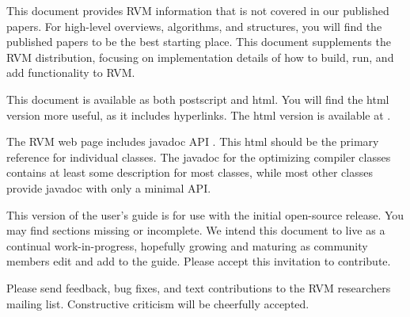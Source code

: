 This document provides RVM information that is not covered in
our published papers.  For high-level overviews, algorithms, and
structures, you will find the published papers to be the best starting
place. This document supplements
the RVM distribution, focusing on implementation
details of how to build, run, and add functionality to RVM.

This document is available as both postscript and html.  You will find the
html version more useful, as it includes hyperlinks. The html version is
available at 
\xlink{{\tt \RVMUserGuideURL}}{\RVMUserGuideURL}.

The RVM web page includes 
javadoc API 
. 
This html should be the
primary reference for individual classes.  The javadoc for the optimizing
compiler classes contains at least some description for most classes,
while most other classes provide javadoc with only a minimal API.

This version of the user's guide is for use with the initial open-source
release.  You may find sections missing or incomplete. We intend this
document to live as a continual work-in-progress, hopefully growing
and maturing as community members edit and add to the
guide.  Please accept this invitation to contribute.

Please send feedback, bug fixes, and text contributions to the RVM
researchers mailing list.  Constructive criticism will be cheerfully 
accepted. 

